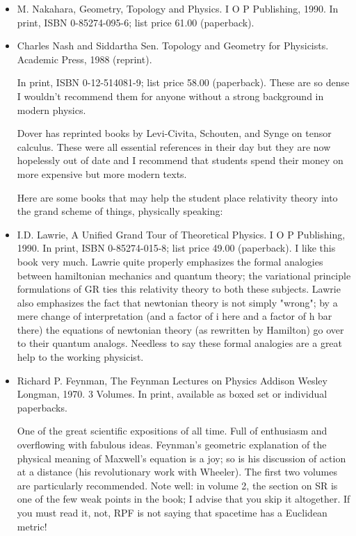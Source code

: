 \documentclass[10pt,a4paper]{book}
\theoremstyle{definition}
\begin{document}
\begin{itemize}
\item M. Nakahara,
Geometry, Topology and Physics.
I O P Publishing, 1990.
In print, ISBN 0-85274-095-6; list price 61.00 (paperback).

\item Charles Nash and Siddartha Sen.
Topology and Geometry for Physicists.
Academic Press, 1988 (reprint).

In print, ISBN 0-12-514081-9; list price 58.00 (paperback).
These are so dense I wouldn't recommend them for anyone without a strong background in modern physics.

Dover has reprinted books by Levi-Civita, Schouten, and Synge on tensor calculus.  These were all essential references in their day but they are now hopelessly out of date and I recommend that students spend their money on more expensive but more modern texts.

Here are some books that may help the student place relativity theory into the grand scheme of things, physically speaking:

\item I.D. Lawrie,
A Unified Grand Tour of Theoretical Physics.
I O P Publishing, 1990.
In print, ISBN 0-85274-015-8; list price 49.00 (paperback).
I like this book very much.  Lawrie quite properly emphasizes the formal analogies between hamiltonian mechanics and quantum theory; the variational principle formulations of GR ties this relativity theory to both these subjects.  Lawrie also emphasizes the fact that newtonian theory is not simply "wrong"; by a mere change of interpretation (and a factor of i here and a factor of h bar there) the equations of newtonian theory (as rewritten by Hamilton) go over to their quantum analogs.  Needless to say these formal analogies are a great help to the working physicist.

\item Richard P. Feynman,
The Feynman Lectures on Physics
Addison Wesley Longman, 1970.  3 Volumes.
In print, available as boxed set or individual paperbacks.

One of the great scientific expositions of all time.  Full of enthusiasm and overflowing with fabulous ideas.  Feynman's geometric explanation of the physical meaning of Maxwell's equation is a joy; so is his discussion of action at a distance (his revolutionary work with Wheeler).  The first two volumes are particularly recommended.  Note well: in volume 2, the section on SR is one of the few weak points in the book; I advise that you skip it altogether.  If you must read it, not, RPF is not saying that spacetime has a Euclidean metric!


\end{itemize}
\end{document}
